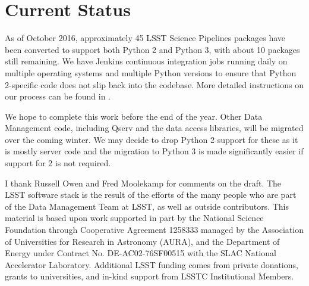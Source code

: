 \documentclass[11pt,twoside]{article}
\begin{document}
\section{Current Status}

As of October 2016, approximately 45 LSST Science Pipelines packages have been converted to support both Python 2 and Python 3, with about 10 packages still remaining.
We have Jenkins continuous integration jobs running daily on multiple operating systems and multiple Python versions to ensure that Python 2-specific code does not slip back into the codebase.
More detailed instructions on our process can be found in \citet{SQR-014}.

We hope to complete this work before the end of the year.
Other Data Management code, including Qserv \citep{Wang:2011:QDS:2063348.2063364} and the data access libraries, will be migrated over the coming winter.
We may decide to drop Python 2 support for these as it is mostly server code and the migration to Python 3 is made significantly easier if support for 2 is not required.

\acknowledgements I thank Russell Owen and Fred Moolekamp for comments on the draft.
The LSST software stack is the result of the efforts of the many people who are part of the Data Management Team at LSST, as well as outside contributors.
This material is based upon work supported in part by the National Science Foundation through Cooperative Agreement 1258333 managed by the Association of Universities for Research in Astronomy (AURA), and the Department of Energy under Contract No. DE-AC02-76SF00515 with the SLAC National Accelerator Laboratory. Additional LSST funding comes from private donations, grants to universities, and in-kind support from LSSTC Institutional Members.

\end{document}

